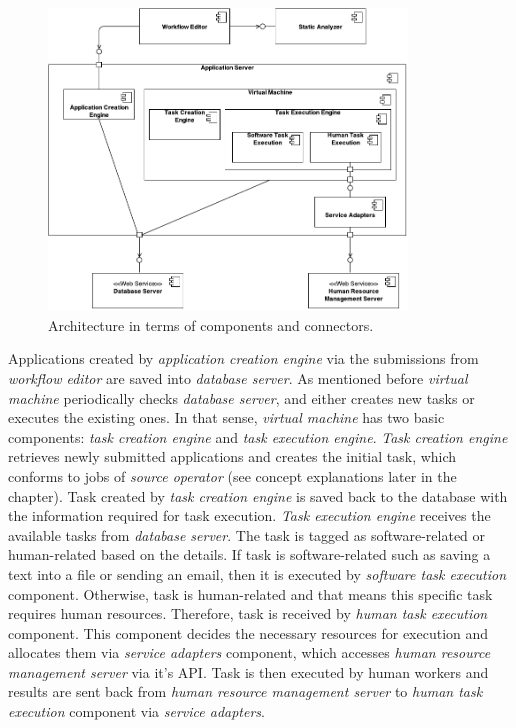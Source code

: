 \begin{figure}[ht]
	\centering
	\includegraphics[width=0.85\textwidth]{figures/architecture/ComponentConnector.pdf}
	\caption{Architecture in terms of components and connectors.}
	\label{fig:componentconnector}
\end{figure}

Applications created by \textit{application creation engine} via the submissions from 
\textit{workflow editor} are saved into \textit{database server}. As mentioned before 
\textit{virtual machine} periodically checks \textit{database server}, and either 
creates new tasks or executes the existing ones. In that sense, \textit{virtual machine} 
has two basic components: \textit{task creation engine} and 
\textit{task execution engine}. \textit{Task creation engine} retrieves newly submitted 
applications and creates the initial task, which conforms to jobs of 
\textit{source operator} (see concept explanations later in the chapter). Task created 
by \textit{task creation engine} is saved back to the database with the information 
required for task execution. \textit{Task execution engine} receives the available 
tasks from \textit{database server}. The task is tagged as software-related or 
human-related based on the details. If task is software-related such as saving 
a text into a file or sending an email, then it is executed by 
\textit{software task execution} component. Otherwise, task is human-related and 
that means this specific task requires human resources. Therefore, task 
is received by \textit{human task execution} component. This component decides 
the necessary resources for execution and allocates them via \textit{service adapters} 
component, which accesses \textit{human resource management server} via it's API. 
Task is then executed by human workers and results are sent back from 
\textit{human resource management server} to \textit{human task execution} 
component via \textit{service adapters}.

